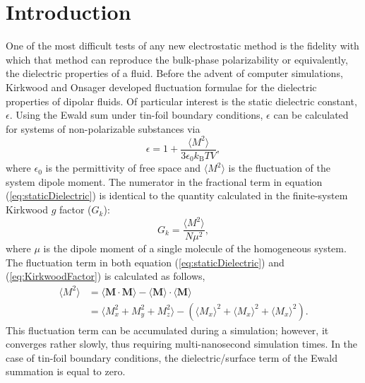 \section{Introduction}
One of the most difficult tests of any new electrostatic method is the
fidelity with which that method can reproduce the bulk-phase
polarizability or equivalently, the dielectric properties of a
fluid. Before the advent of computer simulations, Kirkwood and Onsager
developed fluctuation formulae for the dielectric properties of
dipolar fluids.\cite{Kirkwood39,Onsagar36}
Of particular interest is the static dielectric constant, $\epsilon$.
Using the Ewald sum under tin-foil boundary conditions, $\epsilon$ can
be calculated for systems of non-polarizable substances via
\begin{equation}
\epsilon = 1 + \frac{\langle M^2\rangle}{3\epsilon_0k_\textrm{B}TV},
\label{eq:staticDielectric}
\end{equation}
where $\epsilon_0$ is the permittivity of free space and
$\langle M^2\rangle$ is the fluctuation of the system dipole
moment.\cite{Allen89} The numerator in the fractional term in
equation (\ref{eq:staticDielectric}) is identical to the quantity
calculated in the finite-system Kirkwood $g$ factor ($G_k$):
\begin{equation}
G_k = \frac{\langle M^2\rangle}{N\mu^2},
\label{eq:KirkwoodFactor}
\end{equation}
where $\mu$ is the dipole moment of a single molecule of the
homogeneous system.\cite{NeumannI83,NeumannII83,Neumann84,Neumann85} The
fluctuation term in both equation (\ref{eq:staticDielectric}) and
(\ref{eq:KirkwoodFactor}) is calculated as follows,
\begin{equation}
\begin{split}
\langle M^2\rangle &= \langle\bm{M}\cdot\bm{M}\rangle 
                        - \langle\bm{M}\rangle\cdot\langle\bm{M}\rangle \\
                   &= \langle M_x^2+M_y^2+M_z^2\rangle
                        - (\langle M_x\rangle^2 + \langle M_x\rangle^2 
                                + \langle M_x\rangle^2).        
\end{split}
\label{eq:fluctBoxDipole}
\end{equation}
This fluctuation term can be accumulated during a simulation; however,
it converges rather slowly, thus requiring multi-nanosecond simulation
times.\cite{Horn04} In the case of tin-foil boundary conditions, the
dielectric/surface term of the Ewald summation is equal to zero.

